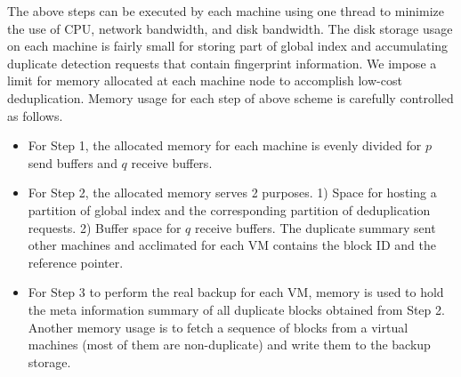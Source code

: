 The above steps can be executed by each machine
using one thread to minimize the use of CPU, network bandwidth, and disk bandwidth.
The  disk storage usage on each machine 
is fairly small for  storing part of global index and
accumulating  duplicate detection requests that contain fingerprint information.   
We impose a limit for memory allocated at each machine node to accomplish low-cost deduplication.  
Memory usage for each step of above scheme is carefully controlled as follows.
\begin{itemize}
\item For Step 1, the allocated memory for each machine is evenly divided for $p$ send buffers and $q$ receive buffers.

\item 
For Step 2,  the allocated memory serves 2 purposes. 1) Space for hosting a partition of global index and 
the corresponding partition of  deduplication requests. 2) Buffer space for $q$ receive buffers.
The duplicate summary sent other machines and acclimated for each VM contains
the block ID and  the reference pointer.   

\item For Step 3 to  perform the real backup for each VM, 
memory is used to hold the meta information summary of all duplicate blocks obtained  from Step 2. 
Another memory usage is to fetch a sequence of blocks from a virtual machines (most of them are non-duplicate) 
and write them to the  backup storage.

\end{itemize}

